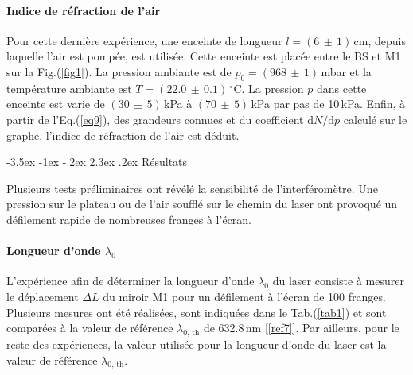 \documentclass[a4paper, 12pt,oneside]{article}
\makeatletter
\renewcommand{\section}{\@startsection {section}{1}{\z@}%
             {-3.5ex \@plus -1ex \@minus -.2ex}%
             {2.3ex \@plus.2ex}%
             {\normalfont\normalsize\bfseries}}
\makeatother
\begin{document}
\paragraph{Indice de réfraction de l'air}
Pour cette dernière expérience, une enceinte de longueur $l=(6\,\pm\,1)\,$cm, depuis laquelle l'air est pompée, est utilisée. Cette enceinte est placée entre le BS et M1 sur la Fig.(\ref{fig1}). La pression ambiante est de $p_0=(968\,\pm\,1)\,$mbar et la température ambiante est $T=(22.0\,\pm\,0.1)\,^\circ$C. La pression $p$ dans cette enceinte est varie de $(30\,\pm\,5)\,$kPa à  $(70\,\pm\,5)\,$kPa par pas de 10\,kPa. Enfin, à partir de l'Eq.(\ref{eq9}), des grandeurs connues et du coefficient $\text{d}N/\text{d}p$ calculé sur le graphe, l'indice de réfraction de l'air est déduit.

\section{Résultats}

Plusieurs tests préliminaires ont révélé la sensibilité de l’interféromètre. Une pression sur le plateau ou de l'air soufflé sur le chemin du laser ont provoqué un défilement rapide de nombreuses franges à l'écran.

\paragraph{Longueur d'onde $\lambda _0$}

L'expérience afin de déterminer la longueur d'onde $\lambda _0$ du laser consiste à mesurer le déplacement $\Delta L$ du miroir M1 pour un défilement à l'écran de 100 franges. Plusieurs mesures ont été réalisées, sont indiquées dans le Tab.(\ref{tab1}) et sont comparées à la valeur de référence $\lambda _{0,\,\text{th}}$ de 632.8\,nm [\ref{ref7}]. Par ailleurs, pour le reste des expériences, la valeur utilisée pour la longueur d'onde du laser est la valeur de référence $\lambda _{0,\,\text{th}}$.
\end{document}
